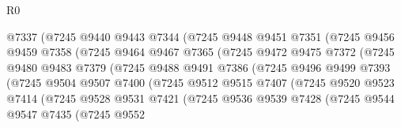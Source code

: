 \begin{lexlean}{R0}
\begin{coremodule}
                        @7337
                        (@7245
                          @9440
                          @9443
                          @7344
                          (@7245
                            @9448
                            @9451
                            @7351
                            (@7245
                              @9456
                              @9459
                              @7358
                              (@7245
                                @9464
                                @9467
                                @7365
                                (@7245
                                  @9472
                                  @9475
                                  @7372
                                  (@7245
                                    @9480
                                    @9483
                                    @7379
                                    (@7245
                                      @9488
                                      @9491
                                      @7386
                                      (@7245
                                        @9496
                                        @9499
                                        @7393
                                        (@7245
                                          @9504
                                          @9507
                                          @7400
                                          (@7245
                                            @9512
                                            @9515
                                            @7407
                                            (@7245
                                              @9520
                                              @9523
                                              @7414
                                              (@7245
                                                @9528
                                                @9531
                                                @7421
                                                (@7245
                                                  @9536
                                                  @9539
                                                  @7428
                                                  (@7245
                                                    @9544
                                                    @9547
                                                    @7435
                                                    (@7245
                                                      @9552

\end{coremodule}
\end{lexlean}
